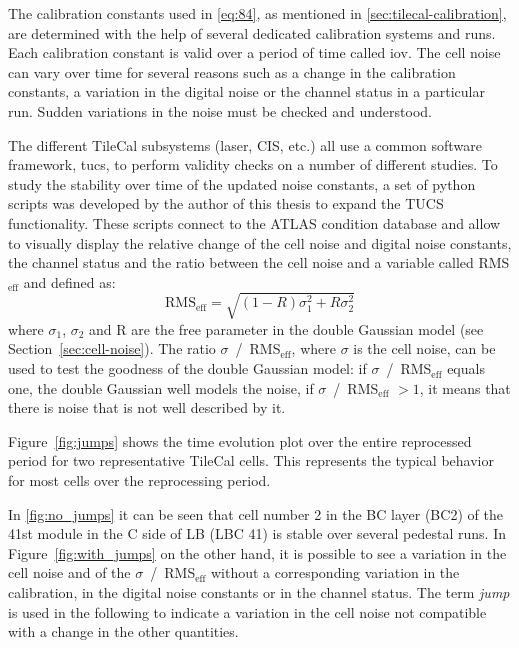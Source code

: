 The calibration constants used in \cref{eq:84}, as mentioned in
\cref{sec:tilecal-calibration}, are determined with the help of several
dedicated calibration systems and runs. Each calibration constant is valid over
a period of time called \gls{iov}. The cell noise can vary over time for several
reasons such as a change in the calibration constants, a variation in the
digital noise or the channel status in a particular run. Sudden variations in
the noise must be checked and understood.

The different TileCal subsystems (laser, CIS, etc.) all use a common software
framework, \gls{tucs}, to perform validity checks on a number of different
studies. To study the stability over time of the updated noise constants, a set
of python scripts was developed by the author of this thesis to expand the TUCS
functionality. These scripts connect to the ATLAS condition database and allow
to visually display the relative change of the cell noise and digital noise
constants, the channel status and the ratio between the cell noise and a
variable called RMS$_\text{eff}$ and defined as:
\begin{equation}
  \label{eq:87}
  \text{RMS}_{\text{eff}} = \sqrt{(1 - R) \sigma_1^2 + R \sigma_2^2}
\end{equation}
where $\sigma_1$, $\sigma_2$ and R are the free parameter in the double Gaussian
model (see Section~\ref{sec:cell-noise}).  The ratio
$\sigma$~/~RMS$_\text{eff}$, where $\sigma$ is the cell noise, can be used to
test the goodness of the double Gaussian model: if $\sigma$~/~RMS$_\text{eff}$
equals one, the double Gaussian well models the noise, if
$\sigma$~/~RMS$_\text{eff}$ $> 1$, it means that there is noise that is not well
described by it.

Figure~\ref{fig:jumps} shows the time evolution plot over the entire reprocessed
period for two representative TileCal cells. This represents the typical
behavior for most cells over the reprocessing period.

In \cref{fig:no_jumps} it can be seen that cell number 2 in the BC layer (BC2)
of the 41st module in the C side of LB (LBC 41) is stable over several pedestal
runs. In Figure~\ref{fig:with_jumps} on the other hand, it is possible to see a
variation in the cell noise and of the $\sigma$~/~RMS$_{\text{eff}}$ without a
corresponding variation in the calibration, in the digital noise constants or in
the channel status. The term \emph{jump} is used in the following to indicate a
variation in the cell noise not compatible with a change in the other
quantities.

